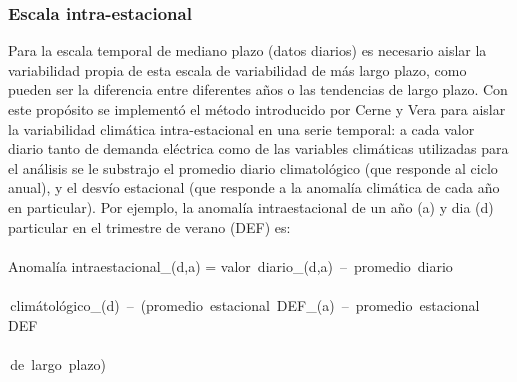 \documentclass[11pt,a4paper]{article}
\begin{document}
\subsubsection{Escala intra-estacional}
Para la escala temporal de mediano plazo (datos diarios) es necesario aislar la variabilidad propia de esta escala de variabilidad de más largo plazo, como pueden ser la diferencia entre diferentes años o las tendencias de largo plazo. Con este propósito se implementó el método introducido por Cerne y Vera \cite{cerne2011influence} para aislar la variabilidad climática intra-estacional en una serie temporal: a cada valor diario tanto de demanda eléctrica como de las variables climáticas utilizadas para el análisis se le substrajo el promedio diario climatológico (que responde al ciclo anual), y el desvío estacional (que responde a la anomalía climática de cada año en particular). Por ejemplo, la anomalía intraestacional de un año (a) y dia (d) particular en el trimestre de verano (DEF) es:
\\\\
Anomalía intraestacional_{(d,a)} =  valor \,diario_{(d,a)} \,–\, promedio \,diario \\\\ \,climátológico_{(d)} \,– \,(promedio \,estacional \,DEF_{(a)} \,– \,promedio \,estacional \,DEF \\\\ \,de \,largo \,plazo)
\\\\
\end{document}
